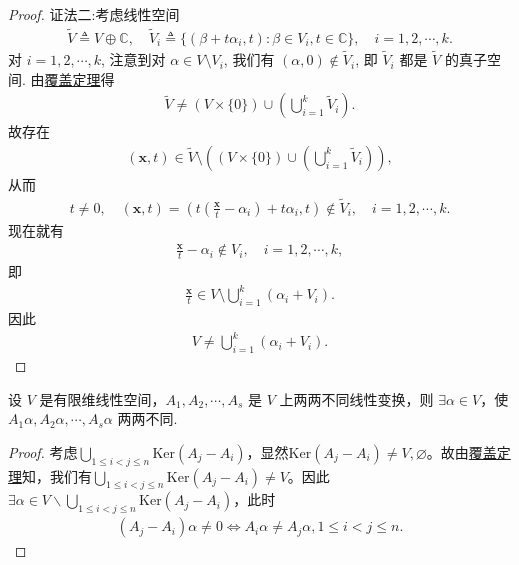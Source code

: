 \documentclass[../../main.tex]{subfiles}%
\begin{document}
\begin{proof}
{\color{blue}证法二:}考虑线性空间
\begin{align*}
\tilde{V} \triangleq V \oplus \mathbb{C}, \quad \tilde{V}_i \triangleq \{ (\beta + t\alpha_i, t) : \beta \in V_i, t \in \mathbb{C} \}, \quad i=1,2,\cdots,k.
\end{align*}
对 \(i=1,2,\cdots,k\), 注意到对 \(\alpha \in V \setminus V_i\), 我们有 \((\alpha, 0) \notin \tilde{V}_i\), 即 \(\tilde{V}_i\) 都是 \(\tilde{V}\) 的真子空间. 由\hyperref[theorem:覆盖定理]{覆盖定理}得
\begin{align*}
\tilde{V} \neq (V \times \{0\}) \cup \left( \bigcup\limits_{i=1}^k \tilde{V}_i \right).
\end{align*}
故存在
\begin{align*}
(\bm{x}, t) \in \tilde{V} \setminus \left( (V \times \{0\}) \cup \left( \bigcup\limits_{i=1}^k \tilde{V}_i \right) \right), 
\end{align*}
从而
\begin{align*}
t \neq 0, \quad (\bm{x}, t) = \left( t\left(\frac{\bm{x}}{t} - \alpha_i\right) + t\alpha_i, t \right) \notin \tilde{V}_i, \quad i=1,2,\cdots,k.
\end{align*}
现在就有
\begin{align*}
\frac{\bm{x}}{t} - \alpha_i \notin V_i, \quad i=1,2,\cdots,k, 
\end{align*}
即
\begin{align*}
\frac{\bm{x}}{t} \in V\setminus \bigcup\limits_{i=1}^k (\alpha_i + V_i). 
\end{align*}
因此
\begin{align*}
V \neq \bigcup\limits_{i=1}^k (\alpha_i + V_i).
\end{align*}
\end{proof}

\begin{example}
设 \( V \) 是有限维线性空间，\( A_1, A_2, \cdots, A_s \) 是 \( V \) 上两两不同线性变换，则 \( \exists \alpha \in V \)，使 \( A_1\alpha, A_2\alpha, \cdots, A_s\alpha \) 两两不同.
\end{example}
\begin{proof}
考虑$\bigcup_{1\leqslant i<j\leqslant n}{\mathrm{Ker}\left( A_j-A_i \right)}$，显然$\mathrm{Ker}\left( A_j-A_i \right) \ne V,\varnothing$。故由\hyperref[theorem:覆盖定理]{覆盖定理}知，我们有$\bigcup_{1\leqslant i<j\leqslant n}{\mathrm{Ker}\left( A_j-A_i \right)}\ne V$。因此$\exists \alpha \in V\backslash \bigcup_{1\leqslant i<j\leqslant n}{\mathrm{Ker}\left( A_j-A_i \right)}$，此时
\begin{align*}
\left( A_j-A_i \right) \alpha \ne 0\Longleftrightarrow A_i\alpha \ne A_j\alpha ,1\leqslant i<j\leqslant n.
\end{align*}
\end{proof}
\end{document}
